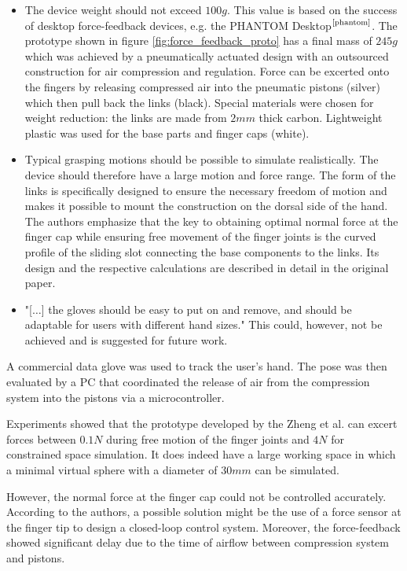 \documentclass[hyperref, bachelorofscience]{cgvpub}
\newcommand{\newcite}[1]{$ ^{\text{\cite{#1}}} $}
\begin{document}
\newpage
\begin{itemize}
	\item The device weight should not exceed $ 100g $. This value is based on the success of desktop force-feedback devices, e.g. the PHANTOM Desktop\newcite{phantom}. The prototype shown in figure \ref{fig:force_feedback_proto} has a final mass of $ 245g $ which was achieved by a pneumatically actuated design with an outsourced construction for air compression and regulation. Force can be excerted onto the fingers by releasing compressed air into the pneumatic pistons (silver) which then pull back the links (black). Special materials were chosen for weight reduction: the links are made from $ 2mm $ thick carbon. Lightweight plastic was used for the base parts and finger caps (white).
	\item Typical grasping motions should be possible to simulate realistically. The device should therefore have a large motion and force range. The form of the links is specifically designed to ensure the necessary freedom of motion and makes it possible to mount the construction on the dorsal side of the hand. The authors emphasize that the key to obtaining optimal normal force at the finger cap while ensuring free movement of the finger joints is the curved profile of the sliding slot connecting the base components to the links. Its design and the respective calculations are described in detail in the original paper.
	\item "[$\dots$] the gloves should be easy to put on and remove, and should be adaptable for users with different hand sizes." This could, however, not be achieved and is suggested for future work.
\end{itemize}

A commercial data glove was used to track the user's hand. The pose was then evaluated by a PC that coordinated the release of air from the compression system into the pistons via a microcontroller. 

Experiments showed that the prototype developed by the Zheng et al. can excert forces between $ 0.1N $ during free motion of the finger joints and $ 4N $ for constrained space simulation. It does indeed have a large working space in which a minimal virtual sphere with a diameter of $ 30mm $ can be simulated.

However, the normal force at the finger cap could not be controlled accurately. According to the authors, a possible solution might be the use of a force sensor at the finger tip to design a closed-loop control system. Moreover, the force-feedback showed significant delay due to the time of airflow between compression system and pistons.
\end{document}
